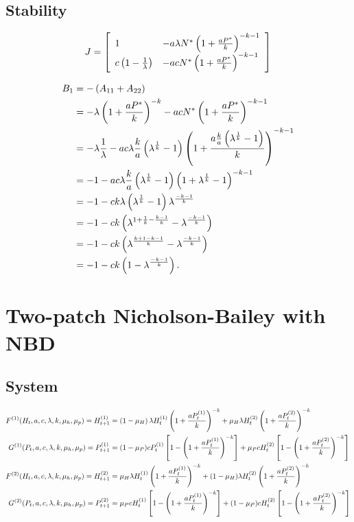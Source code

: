 \documentclass{article}
\begin{document}
\subsection{Stability}
\newcommand{\aPK}{\frac{aP^*}{k}}
\newcommand{\fol}{\frac{1}{\lambda}}
\newcommand{\fok}{\frac{1}{k}}
\newcommand{\fka}{\frac{k}{a}}
\begin{equation*}
J = \left[ \begin{array}{ll}
     1 & 
     -a \lambda N^* \pn{1+\frac{aP^*}{k}}^{-k-1}\\
     c \pn{1-\fol} &
     -a c N^* \pn{1 + \frac{aP^*}{k}}^{-k-1}
 \end{array} \right]
\end{equation*}

\begin{align*}
B_1 &= -\pn{A_{11} + A_{22}}\\
    &= -\lambda \pn{1+\aPK}^{-k} - acN^*\pn{1+\aPK}^{-k-1}\\
    &= -\lambda\fol - ac\lambda\fka \pn{\lambda^\fok-1} \pn{1+\frac{a \fka \pn{\lambda^\fok - 1}}{k}}^{-k-1}\\
    &= -1 - ac \lambda \fka \pn{\lambda^\fok - 1} \pn{1 + \lambda^\fok - 1}^{-k-1}\\
    &= -1 - ck\lambda \pn{\lambda^\fok -1}\lambda^{\frac{-k-1}{k}}\\
    &= -1 - ck\pn{\lambda^{1+\fok-\frac{k-1}{k}} - \lambda^{\frac{-k-1}{k}}}\\
    &= -1 - ck\pn{\lambda^{\frac{k+1-k-1}{k}} - \lambda^{\frac{-k-1}{k}}}\\
    &= -1 - ck\pn{1-\lambda^{\frac{-k-1}{k}}}.
\end{align*}



\pagebreak
\section{Two-patch Nicholson-Bailey with NBD}
\subsection{System}

\newcommand{\Ht}[1] {H^{(#1)}_t}
\newcommand{\Pt}[1] {P^{(#1)}_t}
\newcommand{\Htt}[1] {H^{(#1)}_{t+1}}
\newcommand{\Ptt}[1] {P^{(#1)}_{t+1}}
\newcommand{\apk}[1] {\pn{1+\frac{a\Pt{#1}}{k}}}

\newcommand{\lt}{\left}
\newcommand{\rt}{\right}

\begin{align*}
    F^{(1)}(H_t, a, c, \lambda, k, \mu_h, \mu_p) = \Htt{1} &= \pn{1-\mu_H} \lambda \Ht{1} \apk{1}^{-k} + \mu_H \lambda \Ht{2} \apk{2}^{-k}\\
    G^{(1)}(P_t, a, c, \lambda, k, \mu_h, \mu_p) = \Ptt{1} &= (1-\mu_P) c \Pt{1} \lt[1-\apk{1}^{-k}\rt] + \mu_P c \Ht{2} \lt[1-\apk{2}^{-k}\rt]\\
    F^{(2)}(H_t, a, c, \lambda, k, \mu_h, \mu_p) = \Htt{2} &= \mu_H \lambda \Ht{1} \apk{1}^{-k} + (1-\mu_H) \lambda \Ht{2} \apk{2}^{-k}\\
    G^{(2)}(P_t, a, c, \lambda, k, \mu_h, \mu_p) = \Ptt{2} &= \mu_P c \Ht{1} \lt[1-\apk{1}^{-k}\rt] + (1-\mu_P) c \Ht{2} \lt[1-\apk{2}^{-k}\rt]
\end{align*}
\end{document}
